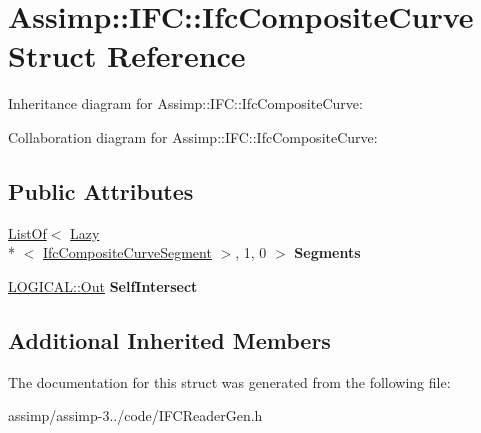 \hypertarget{struct_assimp_1_1_i_f_c_1_1_ifc_composite_curve}{\section{Assimp\+:\+:I\+F\+C\+:\+:Ifc\+Composite\+Curve Struct Reference}
\label{struct_assimp_1_1_i_f_c_1_1_ifc_composite_curve}
}


Inheritance diagram for Assimp\+:\+:I\+F\+C\+:\+:Ifc\+Composite\+Curve\+:


Collaboration diagram for Assimp\+:\+:I\+F\+C\+:\+:Ifc\+Composite\+Curve\+:
\subsection*{Public Attributes}
\begin{DoxyCompactItemize}
\item 
\hypertarget{struct_assimp_1_1_i_f_c_1_1_ifc_composite_curve_a79a2295c7f96afa6dfb2a8e1931d9e88}{\hyperlink{struct_assimp_1_1_s_t_e_p_1_1_list_of}{List\+Of}$<$ \hyperlink{struct_assimp_1_1_s_t_e_p_1_1_lazy}{Lazy}\\*
$<$ \hyperlink{struct_assimp_1_1_i_f_c_1_1_ifc_composite_curve_segment}{Ifc\+Composite\+Curve\+Segment} $>$, 1, 0 $>$ {\bfseries Segments}}\label{struct_assimp_1_1_i_f_c_1_1_ifc_composite_curve_a79a2295c7f96afa6dfb2a8e1931d9e88}

\item 
\hypertarget{struct_assimp_1_1_i_f_c_1_1_ifc_composite_curve_ab10e69d6cf4eab997d126fc044736744}{\hyperlink{classboost_1_1shared__ptr}{L\+O\+G\+I\+C\+A\+L\+::\+Out} {\bfseries Self\+Intersect}}\label{struct_assimp_1_1_i_f_c_1_1_ifc_composite_curve_ab10e69d6cf4eab997d126fc044736744}

\end{DoxyCompactItemize}
\subsection*{Additional Inherited Members}


The documentation for this struct was generated from the following file\+:\begin{DoxyCompactItemize}
\item 
assimp/assimp-\/3../code/I\+F\+C\+Reader\+Gen.\+h\end{DoxyCompactItemize}
